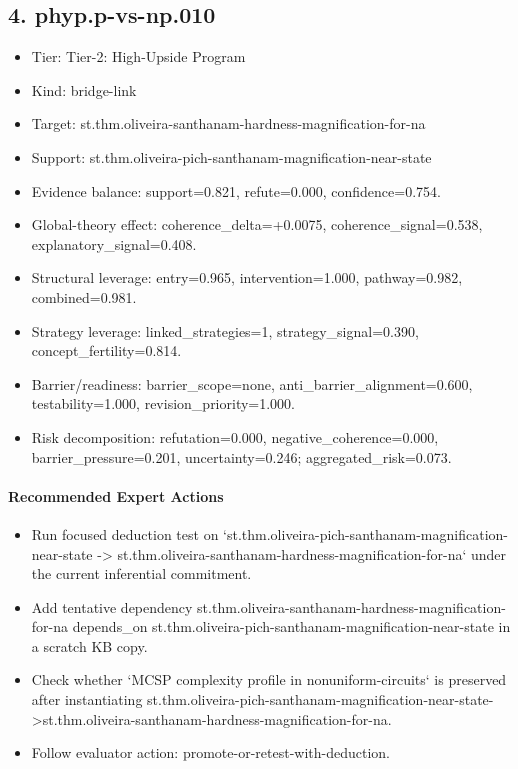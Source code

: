 \documentclass[11pt]{article}
\begin{document}
\subsection*{4. phyp.p-vs-np.010}
\begin{itemize}
\item Tier: Tier-2: High-Upside Program
\item Kind: bridge-link
\item Target: st.thm.oliveira-santhanam-hardness-magnification-for-na
\item Support: st.thm.oliveira-pich-santhanam-magnification-near-state
\item Evidence balance: support=0.821, refute=0.000, confidence=0.754.
\item Global-theory effect: coherence\_delta=+0.0075, coherence\_signal=0.538, explanatory\_signal=0.408.
\item Structural leverage: entry=0.965, intervention=1.000, pathway=0.982, combined=0.981.
\item Strategy leverage: linked\_strategies=1, strategy\_signal=0.390, concept\_fertility=0.814.
\item Barrier/readiness: barrier\_scope=none, anti\_barrier\_alignment=0.600, testability=1.000, revision\_priority=1.000.
\item Risk decomposition: refutation=0.000, negative\_coherence=0.000, barrier\_pressure=0.201, uncertainty=0.246; aggregated\_risk=0.073.
\end{itemize}
\paragraph{Recommended Expert Actions}
\begin{itemize}
\item Run focused deduction test on `st.thm.oliveira-pich-santhanam-magnification-near-state -> st.thm.oliveira-santhanam-hardness-magnification-for-na` under the current inferential commitment.
\item Add tentative dependency st.thm.oliveira-santhanam-hardness-magnification-for-na depends\_on st.thm.oliveira-pich-santhanam-magnification-near-state in a scratch KB copy.
\item Check whether `MCSP complexity profile in nonuniform-circuits` is preserved after instantiating st.thm.oliveira-pich-santhanam-magnification-near-state->st.thm.oliveira-santhanam-hardness-magnification-for-na.
\item Follow evaluator action: promote-or-retest-with-deduction.
\end{itemize}
\end{document}
